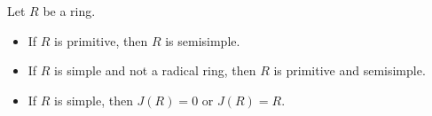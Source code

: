 Let $R$ be a ring.
\begin{itemize}
\item[(i)] If $R$ is primitive, then $R$ is semisimple.
\item[(ii)] If $R$ is simple and not a radical ring, then $R$ is primitive and semisimple.
\item[(iii)] If $R$ is simple, then $J(R) = 0$ or $J(R) = R$.
\end{itemize}
